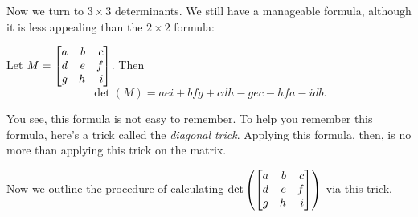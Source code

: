  Now we turn
to $3\times 3$ determinants. We still have a manageable formula, although it is less
appealing than the $2\times 2$ formula:
\begin{theorem}
	Let $M=\mat{a & b & c \\ d & e & f \\ g & h & i}$. Then
	\[
		\det(M)=aei+bfg+cdh-gec-hfa-idb.
	\]
\end{theorem}
You see, this formula is not easy to remember. To help you remember this formula,
here's a trick called the \textit{diagonal trick}. Applying this formula, then, is
no more than applying this trick on the matrix.

Now we outline the procedure of calculating $\det\left(\mat{a & b & c \\ d & e & f \\ g & h & i}\right)
$ via this trick.

